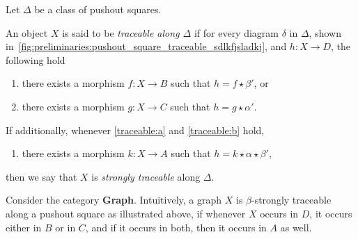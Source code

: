 \begin{definition}
    \label{def:traceability}
Let $\Delta$ be a class of pushout squares. 

An object $X$ is said to be \emph{traceable along $\Delta$} if for every diagram $\delta$ in $\Delta$, shown in~\autoref{fig:preliminaries:pushout_square_traceable_sdlkfjsladkj}, and $h:X \to D$,       
 the following hold
    \begin{enumerate}[label=(\alph*)]
        \item\label{traceable:a} there exists a morphism $f : X \to B$ such that $h = f \star \beta'$, or
        \item\label{traceable:b} there exists a morphism $g : X \to C$ such that $h = g \star \alpha'$.
    \end{enumerate}
    \begin{figure}[H]
    \centering
    \caption{}
    \label{fig:preliminaries:pushout_square_traceable_sdlkfjsladkj}
\end{figure}
    If additionally, 
    whenever \ref{traceable:a} and \ref {traceable:b} hold,
    \begin{enumerate}[label=(\alph*),resume]
        \item 
        there exists a morphism $k : X \to A$ such that $h = k \star \alpha \star \beta' $,
    \end{enumerate}
    then we say that $X$ is \emph{strongly traceable} along $\Delta$.
\end{definition}
Consider the category \textbf{Graph}. Intuitively, a graph $X$ is $\beta$-strongly traceable along a pushout square as illustrated above, if whenever $X$ occurs in $D$, it occurs either in $B$ or in $C$, and if it occurs in both, then it occurs in $A$ as well.


